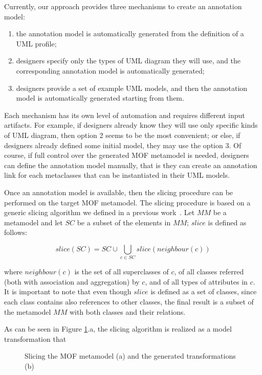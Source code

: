 Currently, our approach provides three mechanisms to create an annotation model:

\begin{enumerate}
	\item the annotation model is automatically generated from the definition of a UML profile;
	\item designers specify only the types of UML diagram they will use, and the corresponding annotation model is automatically generated;
	\item designers provide a set of example UML models, and then the annotation model is automatically generated starting from them.
\end{enumerate}

Each mechanism has its own level of automation and requires different input artifacts. 
For example, if designers already know they will use only specific kinds of UML diagram, then option 2 seems to be the most convenient;
or else, if designers already defined some initial model, they may use the option 3.
Of course, if full control over the generated MOF metamodel is needed, designers can define the annotation model manually, that is they can create an annotation link for each metaclasses that can be instantiated in their UML models.

Once an annotation model is available, then the slicing procedure can be performed on the target MOF metamodel.
The slicing procedure is based on a generic slicing algorithm we defined in a previous work~\cite{ICSEbyadl}. Let
$MM$ be a metamodel and let $SC$ be a subset of the elements in
$MM$; $slice$ is defined as follows:

\vspace{-.2cm}
$$slice(SC)=SC \cup \displaystyle\bigcup_{c \in
SC}{slice(neighbour(c))}$$
\vspace{-.2cm}

\noindent where $neighbour(c)$ is the set of all superclasses of
$c$, of all classes referred (both with association and
aggregation) by $c$, and of all types of attributes
in $c$. 
It is important to note that even though $slice$ is defined
as a set of classes, since each class contains also references
to other classes, the final result is a subset of the metamodel $MM$
with both classes and their relations.


As can be seen in Figure \ref{fig:slicing}.a, the slicing algorithm is realized as a model transformation that 


 \begin{figure}[htbp]
  \centering
  \caption{Slicing the MOF metamodel (a) and the generated transformations (b)}
  \label{fig:slicing}
\end{figure}






